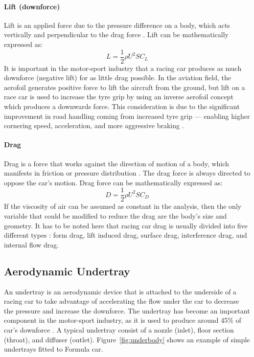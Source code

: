 \paragraph{Lift (downforce)}
Lift is an applied force due to the pressure difference on a body, which acts vertically and perpendicular to the drag force \cite{Scibor-Rylski1984RoadAerodynamics}. Lift can be mathematically expressed as:
\begin{equation}
    L = \frac{1}{2}\rho U^2 S C_L
\end{equation}
It is important in the motor-sport industry that a racing car produces as much downforce (negative lift) for as little drag possible. In the aviation field, the aerofoil generates positive force to lift the aircraft from the ground, but lift on a race car is used to increase the tyre grip by using an inverse aerofoil concept which produces a downwards force. This consideration is due to the significant improvement in road handling coming from increased tyre grip --- enabling higher cornering speed, acceleration, and more aggressive braking \cite{Barnard1997RoadIntroduction}.


\paragraph{Drag}
Drag is a force that works against the direction of motion of a body, which manifests in friction or pressure distribution \cite{Obidi2014TheoryVehicles}. The drag force is always directed to oppose the car's motion. Drag force can be mathematically expressed as:
\begin{equation}
    D = \frac{1}{2}\rho U^2 S C_D
\end{equation}
If the viscosity of air can be assumed as constant in the analysis, then the only variable that could be modified to reduce the drag are the body's size and geometry. It has to be noted here that racing car drag is usually divided into five different types \cite{Kelly1964AerodynamicsEngineers}: form drag, lift induced drag, surface drag, interference drag, and internal flow drag.

\subsection{Aerodynamic Undertray}
An undertray is an aerodynamic device that is attached to the underside of a racing car to take advantage of accelerating the flow under the car to decrease the pressure and increase the downforce. The undertray has become an important component in the motor-sport industry, as it is used to produce around 45\% of car's downforce \cite{Katz1995RaceSpeed}. A typical undertray consist of a nozzle (inlet), floor section (throat), and diffuser (outlet). Figure~\ref{fig:underbody} shows an example of simple undertrays fitted to  Formula car.

